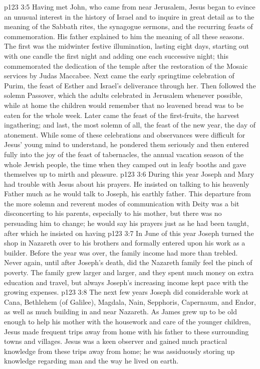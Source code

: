 \vs p123 3:5 \pc Having met John, who came from near Jerusalem, Jesus began to evince an unusual interest in the history of Israel and to inquire in great detail as to the meaning of the Sabbath rites, the synagogue sermons, and the recurring feasts of commemoration. His father explained to him the meaning of all these seasons. The first was the midwinter festive illumination, lasting eight days, starting out with one candle the first night and adding one each successive night; this commemorated the dedication of the temple after the restoration of the Mosaic services by Judas Maccabee. Next came the early springtime celebration of Purim, the feast of Esther and Israel’s deliverance through her. Then followed the solemn Passover, which the adults celebrated in Jerusalem whenever possible, while at home the children would remember that no leavened bread was to be eaten for the whole week. Later came the feast of the first\hyp{}fruits, the harvest ingathering; and last, the most solemn of all, the feast of the new year, the day of atonement. While some of these celebrations and observances were difficult for Jesus’ young mind to understand, he pondered them seriously and then entered fully into the joy of the feast of tabernacles, the annual vacation season of the whole Jewish people, the time when they camped out in leafy booths and gave themselves up to mirth and pleasure.
\vs p123 3:6 \pc During this year Joseph and Mary had trouble with Jesus about his prayers. He insisted on talking to his heavenly Father much as he would talk to Joseph, his earthly father. This departure from the more solemn and reverent modes of communication with Deity was a bit disconcerting to his parents, especially to his mother, but there was no persuading him to change; he would say his prayers just as he had been taught, after which he insisted on having 
\vs p123 3:7 In June of this year Joseph turned the shop in Nazareth over to his brothers and formally entered upon his work as a builder. Before the year was over, the family income had more than trebled. Never again, until after Joseph’s death, did the Nazareth family feel the pinch of poverty. The family grew larger and larger, and they spent much money on extra education and travel, but always Joseph’s increasing income kept pace with the growing expenses.
\vs p123 3:8 The next few years Joseph did considerable work at Cana, Bethlehem (of Galilee), Magdala, Nain, Sepphoris, Capernaum, and Endor, as well as much building in and near Nazareth. As James grew up to be old enough to help his mother with the housework and care of the younger children, Jesus made frequent trips away from home with his father to these surrounding towns and villages. Jesus was a keen observer and gained much practical knowledge from these trips away from home; he was assiduously storing up knowledge regarding man and the way he lived on earth.
